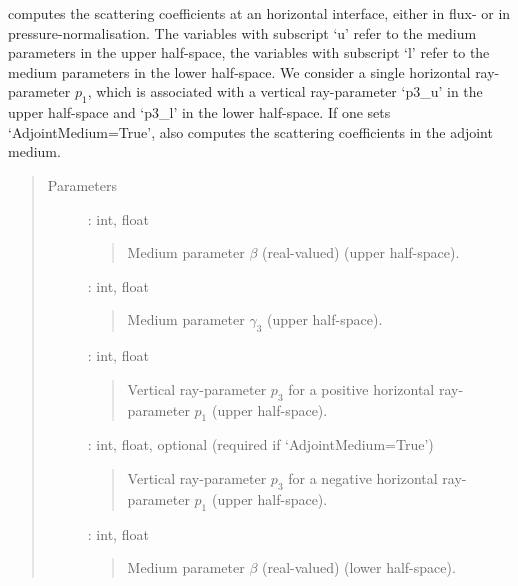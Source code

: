 \documentclass[letterpaper,10pt,english]{sphinxmanual}
\begin{document}
\begin{fulllineitems}
\begin{fulllineitems}
\label{\detokenize{Layered_NRM_p_w:Layered_NRM_p_w.Layered_NRM_p_w.RT_p_w}}
computes the scattering coefficients at an horizontal interface, either in flux- or in pressure-normalisation. The variables with subscript ‘u’ refer to the medium parameters in the upper half-space, the variables with subscript ‘l’ refer to the medium parameters in the lower half-space. We consider a single horizontal ray-parameter \(p_1\), which is associated with a vertical ray-parameter ‘p3\_u’ in the upper half-space and ‘p3\_l’ in the lower half-space. If one sets ‘AdjointMedium=True’,  also computes the scattering coefficients in the adjoint medium.
\begin{quote}\begin{description}
\item[{Parameters}] \leavevmode
{} : int, float
\begin{quote}

Medium parameter \(\beta\) (real-valued) (upper half-space).
\end{quote}

 : int, float
\begin{quote}

Medium parameter \(\gamma_3\) (upper half-space).
\end{quote}

 : int, float
\begin{quote}

Vertical ray-parameter \(p_3\) for a positive horizontal ray-parameter \(p_1\) (upper half-space).
\end{quote}

 : int, float, optional (required if ‘AdjointMedium=True’)
\begin{quote}

Vertical ray-parameter \(p_3\) for a negative horizontal ray-parameter \(p_1\) (upper half-space).
\end{quote}

 : int, float
\begin{quote}

Medium parameter \(\beta\) (real-valued) (lower half-space).
\end{quote}


\end{description}
\end{quote}
\end{fulllineitems}
\end{fulllineitems}
\end{document}
